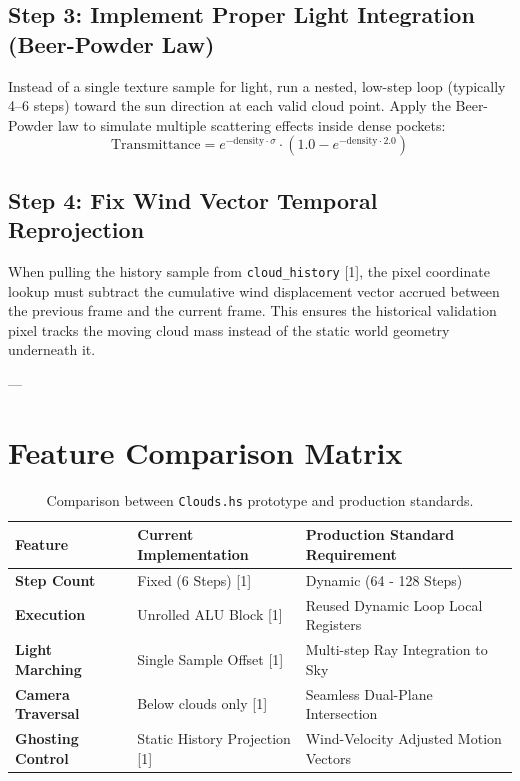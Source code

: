 \documentclass[11pt,a4paper]{article}
\begin{document}
\subsection{Step 3: Implement Proper Light Integration (Beer-Powder Law)}
Instead of a single texture sample for light, run a nested, low-step loop (typically 4--6 steps) toward the sun direction at each valid cloud point. Apply the Beer-Powder law to simulate multiple scattering effects inside dense pockets:
\begin{equation}
    \text{Transmittance} = e^{-\text{density} \cdot \sigma} \cdot (1.0 - e^{-\text{density} \cdot 2.0})
\end{equation}

\subsection{Step 4: Fix Wind Vector Temporal Reprojection}
When pulling the history sample from \texttt{cloud\_history} [1], the pixel coordinate lookup must subtract the cumulative wind displacement vector accrued between the previous frame and the current frame. This ensures the historical validation pixel tracks the moving cloud mass instead of the static world geometry underneath it.

---

\section{Feature Comparison Matrix}

\begin{table}[h!]
\centering
\small
\begin{tabular}{lll}
\toprule
\textbf{Feature} & \textbf{Current Implementation} & \textbf{Production Standard Requirement} \\ \midrule
\textbf{Step Count} & Fixed (6 Steps) [1] & Dynamic (64 - 128 Steps) \\
\textbf{Execution} & Unrolled ALU Block [1] & Reused Dynamic Loop Local Registers \\
\textbf{Light Marching} & Single Sample Offset [1] & Multi-step Ray Integration to Sky \\
\textbf{Camera Traversal} & Below clouds only [1] & Seamless Dual-Plane Intersection \\
\textbf{Ghosting Control} & Static History Projection [1] & Wind-Velocity Adjusted Motion Vectors \\ \bottomrule
\end{tabular}
\caption{Comparison between \texttt{Clouds.hs} prototype and production standards.}
\end{table}
\end{document}
